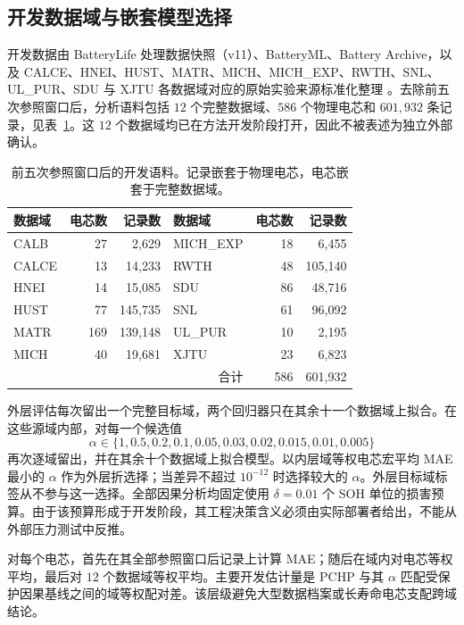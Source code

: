 \documentclass[UTF8,11pt]{ctexart}
\begin{document}
\subsection{开发数据域与嵌套模型选择}

开发数据由 BatteryLife 处理数据快照（v11）、BatteryML、Battery Archive，以及 CALCE、HNEI、HUST、MATR、MICH、MICH\_EXP、RWTH、SNL、UL\_PUR、SDU 与 XJTU 各数据域对应的原始实验来源标准化整理 \citep{zhang2024batteryml,tan2025batterylife,batterylife2026processed,batteryarchive,xing2013ensemble,devie2018variability,ma2022personalized,severson2019cyclelife,attia2020closedloop,weng2021formation,li2021oneshot,preger2020degradation,juarezrobles2020safety,wang2025sorting,wang2024pinn}。去除前五次参照窗口后，分析语料包括 $12$ 个完整数据域、$586$ 个物理电芯和 $601{,}932$ 条记录，见表~\ref{tab:data_zh}。这 $12$ 个数据域均已在方法开发阶段打开，因此不被表述为独立外部确认。

\begin{table}[t]
\centering
\caption{前五次参照窗口后的开发语料。记录嵌套于物理电芯，电芯嵌套于完整数据域。}
\label{tab:data_zh}
\begin{tabular}{lrr@{\qquad}lrr}
\toprule
数据域 & 电芯数 & 记录数 & 数据域 & 电芯数 & 记录数 \\
\midrule
CALB & 27 & 2,629 & MICH\_EXP & 18 & 6,455 \\
CALCE & 13 & 14,233 & RWTH & 48 & 105,140 \\
HNEI & 14 & 15,085 & SDU & 86 & 48,716 \\
HUST & 77 & 145,735 & SNL & 61 & 96,092 \\
MATR & 169 & 139,148 & UL\_PUR & 10 & 2,195 \\
MICH & 40 & 19,681 & XJTU & 23 & 6,823 \\
\midrule
\multicolumn{4}{r}{合计} & 586 & 601,932 \\
\bottomrule
\end{tabular}
\end{table}

外层评估每次留出一个完整目标域，两个回归器只在其余十一个数据域上拟合。在这些源域内部，对每一个候选值
\[
\alpha\in\{1,0.5,0.2,0.1,0.05,0.03,0.02,0.015,0.01,0.005\}
\]
再次逐域留出，并在其余十个数据域上拟合模型。以内层域等权电芯宏平均 MAE 最小的 $\alpha$ 作为外层折选择；当差异不超过 $10^{-12}$ 时选择较大的 $\alpha$。外层目标域标签从不参与这一选择。全部因果分析均固定使用 $\delta=0.01$ 个 SOH 单位的损害预算。由于该预算形成于开发阶段，其工程决策含义必须由实际部署者给出，不能从外部压力测试中反推。

对每个电芯，首先在其全部参照窗口后记录上计算 MAE；随后在域内对电芯等权平均，最后对 $12$ 个数据域等权平均。主要开发估计量是 PCHP 与其 $\alpha$ 匹配受保护因果基线之间的域等权配对差。该层级避免大型数据档案或长寿命电芯支配跨域结论。
\end{document}
